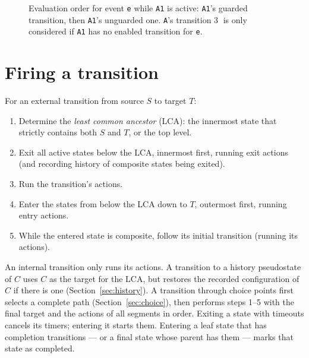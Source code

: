 \documentclass[11pt,a4paper,openany]{report}
\newcommand{\code}[1]{\texttt{#1}}
\begin{document}
\begin{figure}[H]
\centering
{}
\caption{Evaluation order for event \code{e} while \code{A1} is active: \code{A1}'s guarded transition,
then \code{A1}'s unguarded one. \code{A}'s transition \textcircled{\scriptsize 3} is only considered
if \code{A1} has no enabled transition for \code{e}.}
\label{fig:priority}
\end{figure}

\section{Firing a transition}
For an external transition from source $S$ to target $T$:
\begin{enumerate}[itemsep=1pt]
  \item Determine the \emph{least common ancestor} (LCA): the innermost state that strictly contains
        both $S$ and $T$, or the top level.
  \item Exit all active states below the LCA, innermost first, running exit actions (and recording
        history of composite states being exited).
  \item Run the transition's actions.
  \item Enter the states from below the LCA down to $T$, outermost first, running entry actions.
  \item While the entered state is composite, follow its initial transition (running its actions).
\end{enumerate}
An internal transition only runs its actions. A transition to a history pseudostate of $C$ uses $C$ as
the target for the LCA, but restores the recorded configuration of $C$ if there is one
(Section~\ref{sec:history}). A transition through choice
points first selects a complete path (Section~\ref{sec:choice}), then performs steps 1--5 with the
final target and the actions of all segments in order. Exiting a state with timeouts cancels its
timers; entering it starts them. Entering a leaf state that has completion transitions --- or a final
state whose parent has them --- marks that state as completed.
\end{document}
